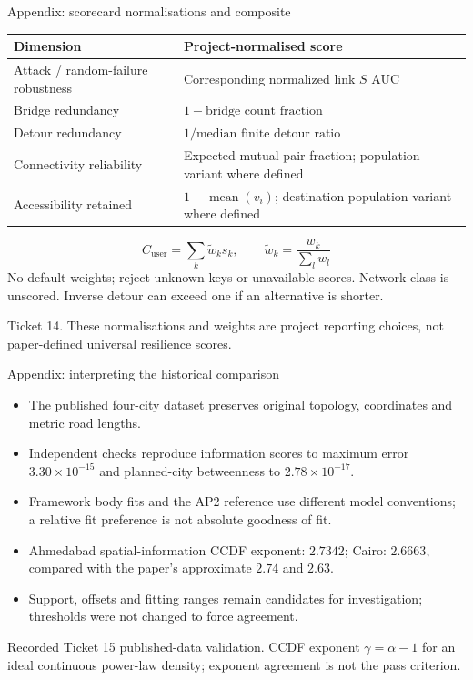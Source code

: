 \documentclass[11pt,aspectratio=169]{beamer}
\newcommand{\src}[1]{\vfill{\fontsize{7.5}{9}\selectfont\color{Muted}#1\par}}
\newcommand{\smallitems}{\setlength{\itemsep}{1.5mm}}
\begin{document}
\begin{frame}{Appendix: scorecard normalisations and composite}
\small\renewcommand{\arraystretch}{1.07}
\begin{tabular}{P{5.4cm}P{7.6cm}}
\toprule\textbf{Dimension} & \textbf{Project-normalised score}\\\midrule
Attack / random-failure robustness & Corresponding normalized link $S$ AUC\\
Bridge redundancy & $1-\text{bridge count fraction}$\\
Detour redundancy & $1/\text{median finite detour ratio}$\\
Connectivity reliability & Expected mutual-pair fraction; population variant where defined\\
Accessibility retained & $1-\operatorname{mean}(v_i)$; destination-population variant where defined\\
\bottomrule
\end{tabular}
\vspace{2mm}
\[
C_{\mathrm{user}}=\sum_k\widetilde w_k s_k,\qquad
\widetilde w_k=\frac{w_k}{\sum_l w_l}
\]
\small No default weights; reject unknown keys or unavailable scores. Network class is unscored. Inverse detour can exceed one if an alternative is shorter.
\src{Ticket 14. These normalisations and weights are project reporting choices, not paper-defined universal resilience scores.}
\end{frame}

\begin{frame}{Appendix: interpreting the historical comparison}
\begin{itemize}\smallitems
\item The published four-city dataset preserves original topology, coordinates and metric road lengths.
\item Independent checks reproduce information scores to maximum error $3.30\times10^{-15}$ and planned-city betweenness to $2.78\times10^{-17}$.
\item Framework body fits and the AP2 reference use different model conventions; a relative fit preference is not absolute goodness of fit.
\item Ahmedabad spatial-information CCDF exponent: $2.7342$; Cairo: $2.6663$, compared with the paper's approximate $2.74$ and $2.63$.
\item Support, offsets and fitting ranges remain candidates for investigation; thresholds were not changed to force agreement.
\end{itemize}
\src{Recorded Ticket 15 published-data validation. CCDF exponent $\gamma=\alpha-1$ for an ideal continuous power-law density; exponent agreement is not the pass criterion.}
\end{frame}
\end{document}
